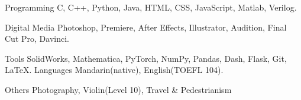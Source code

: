 

\begin{cvskills}

\cvskill
  {Programming} %
  {C, C++, Python, Java, HTML, CSS, JavaScript, Matlab, Verilog.} %

\cvskill
{Digital Media} %
{Photoshop, Premiere, After Effects, Illustrator, Audition, Final Cut Pro, Davinci.} %

\cvskill
{Tools} %
{SolidWorks, Mathematica, PyTorch, NumPy, Pandas, Dash, Flask, Git, \LaTeX.} %
\cvskill
{Languages} %
{Mandarin(native), English(TOEFL 104).} %

\cvskill
{Others} %
{Photography, Violin(Level 10), Travel \& Pedestrianism } %

\end{cvskills}


